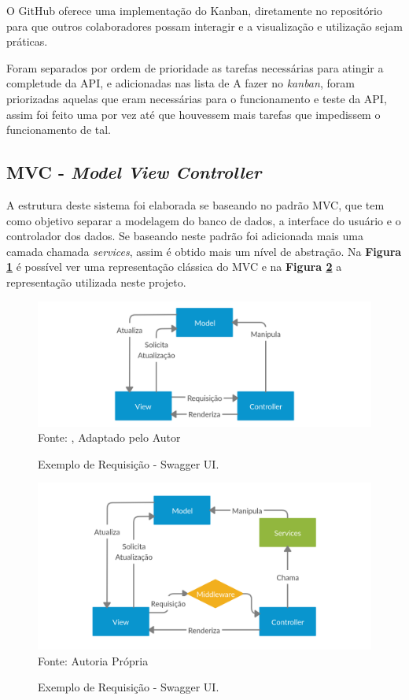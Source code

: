 O GitHub oferece uma implementação do Kanban, diretamente no repositório para que outros colaboradores possam interagir e a visualização e utilização sejam práticas.

Foram separados por ordem de prioridade as tarefas necessárias para atingir a completude da API, e adicionadas nas lista de A fazer no \textit{kanban}, foram priorizadas aquelas que eram necessárias para o funcionamento e teste da API, assim foi feito uma por vez até que houvessem mais tarefas que impedissem o funcionamento de tal.

\subsection{MVC - \textit{Model View Controller}}

A estrutura deste sistema foi elaborada se baseando no padrão MVC, que tem como objetivo separar a modelagem do banco de dados, a interface do usuário e o controlador dos dados. Se baseando neste padrão foi adicionada mais uma camada chamada \textit{services}, assim é obtido mais um nível de abstração. Na \textbf{Figura \ref{MVCadptFromPressman}} é possível ver uma representação clássica do MVC e na \textbf{Figura \ref{MVSC}} a representação utilizada neste projeto.

\begin{figure}[!ht]
\centering
\captionsetup{justification   = raggedright,
              singlelinecheck = false}
\caption{Exemplo de Requisição - Swagger UI.}\label{MVCadptFromPressman}
\includegraphics[scale=0.4]{figs/MVC.png}
\footnotesize Fonte: \cite{pressman2005software}, Adaptado pelo Autor
\end{figure}

\begin{figure}[!ht]
\centering
\captionsetup{justification   = raggedright,
              singlelinecheck = false}
\caption{Exemplo de Requisição - Swagger UI.}\label{MVSC}
\includegraphics[scale=0.4]{figs/MVSC.png}
\footnotesize Fonte: Autoria Própria
\end{figure}


